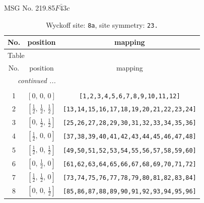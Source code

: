 \documentclass[fleqn,8pt]{jsarticle}
\begin{document}
\setcounter{MaxMatrixCols}{32}

\renewcommand{\tablename}{Table~}
\renewcommand{\figurename}{Figure~}
\begin{center}
\LARGE
MSG No. 219.85\quad$F\bar{4}3c$
\end{center}
\renewcommand{\arraystretch}{1.2}
\begin{longtable}{ccc}
\caption{Wyckoff site: {\tt 8a}, site symmetry: {\tt 23.}}
 \\
 \hline \hline
No. & position & mapping \\ \hline \endfirsthead

\multicolumn{2}{l}{\tablename\ \thetable{}} \\
 \hline \hline
No. & position & mapping \\ \hline \endhead

 \hline \hline
\multicolumn{2}{r}{\footnotesize\it continued ...} \\ \endfoot

 \hline \hline
\multicolumn{2}{r}{} \\ \endlastfoot

1 & $\left[ 0,\, 0,\, 0 \right]$ & {\tt [1,2,3,4,5,6,7,8,9,10,11,12]} \\ \hline
2 & $\left[ \frac{1}{2},\, \frac{1}{2},\, \frac{1}{2} \right]$ & {\tt [13,14,15,16,17,18,19,20,21,22,23,24]} \\ \hline
3 & $\left[ 0,\, \frac{1}{2},\, \frac{1}{2} \right]$ & {\tt [25,26,27,28,29,30,31,32,33,34,35,36]} \\ \hline
4 & $\left[ \frac{1}{2},\, 0,\, 0 \right]$ & {\tt [37,38,39,40,41,42,43,44,45,46,47,48]} \\ \hline
5 & $\left[ \frac{1}{2},\, 0,\, \frac{1}{2} \right]$ & {\tt [49,50,51,52,53,54,55,56,57,58,59,60]} \\ \hline
6 & $\left[ 0,\, \frac{1}{2},\, 0 \right]$ & {\tt [61,62,63,64,65,66,67,68,69,70,71,72]} \\ \hline
7 & $\left[ \frac{1}{2},\, \frac{1}{2},\, 0 \right]$ & {\tt [73,74,75,76,77,78,79,80,81,82,83,84]} \\ \hline
8 & $\left[ 0,\, 0,\, \frac{1}{2} \right]$ & {\tt [85,86,87,88,89,90,91,92,93,94,95,96]} \\
\end{longtable}
\renewcommand{\arraystretch}{1.2}
\end{document}
